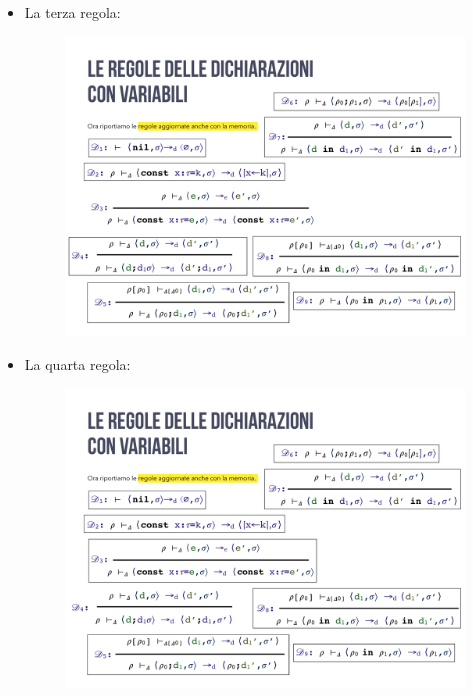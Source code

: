 \documentclass[a4paper]{article}
\begin{document}
\begin{itemize}
 		\item La terza regola:
 		\begin{figure}[!htp]
 			\centering
 			\includegraphics[width=\textwidth]{img/regola_dichiarazione-up-3.pdf}
 		\end{figure}
 	
 		\item La quarta regola:
 		\begin{figure}[!htp]
 			\centering
 			\includegraphics[width=.8\textwidth]{img/regola_dichiarazione-up-4.pdf}
 		\end{figure}
 		

\end{itemize}
\end{document}
